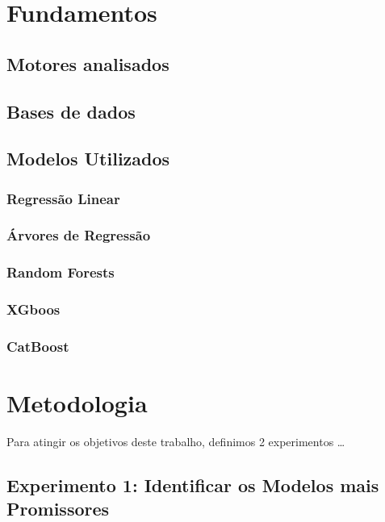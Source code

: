 \documentclass{article}
\begin{document}
\section{Fundamentos}



\subsection{Motores analisados}

\subsection{Bases de dados}

\subsection{Modelos Utilizados}

\subsubsection{Regressão Linear}
\subsubsection{Árvores de Regressão}
\subsubsection{Random Forests}
\subsubsection{XGboos}
\subsubsection{CatBoost}

\section{Metodologia}
Para atingir os objetivos deste trabalho, definimos 2 experimentos \dots

\subsection{Experimento 1: Identificar os Modelos mais Promissores}
\end{document}
